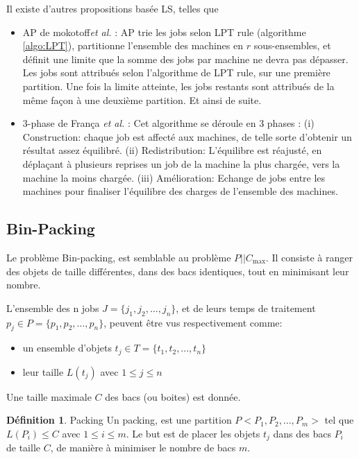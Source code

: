 \documentclass[a4paper,12pt]{report}
\theoremstyle{plain}				%
\theoremstyle{definition}				%
\newtheorem{definition}{Définition} %
\newcommand\problemGrahamP{$P||C_{\max}$\xspace}
\newcommand{\lp}[1]{\todo[author=LP,color=yellow,inline]{#1}}
\newcommand{\fco}[1]{\todo[author=FCO,color=blue,inline]{#1}}
\begin{document}
Il existe d'autres propositions basée LS, telles que
\begin{itemize}


\item AP de mokotoff\emph{et al.} \cite{mokotoff2004exact}:
AP trie les jobs selon LPT rule (algorithme \ref{algo:LPT}),
partitionne l'ensemble des machines en $r$ sous-ensembles, et définit
une limite que la somme des jobs par machine ne devra pas dépasser.
Les jobs sont attribués selon l'algorithme de LPT rule, sur une
première partition.
Une fois la limite atteinte, les jobs restants sont attribués de la
même façon à une deuxième partition.
Et ainsi de suite.

\item 3-phase de França \emph{et al.} \cite{francca1994composite}:
  Cet algorithme se déroule en 3 phases :
  (i) Construction: chaque job est affecté aux machines, de telle
  sorte d'obtenir un résultat assez équilibré.
  (ii) Redistribution: L'équilibre est réajusté, en déplaçant à
  plusieurs reprises un job de la machine la plus chargée, vers
  la machine la moins chargée.
  (iii) Amélioration: Echange de jobs entre les machines pour
  finaliser l'équilibre des charges de l'ensemble des machines.

\end{itemize}

\lp{Dire en 2 mots ce qu'ils font?}
\fco{ok, fait}


\subsection{Bin-Packing} \label{ssec:heuristiquesBinPacking}

Le problème Bin-packing, est semblable au problème \problemGrahamP.
Il consiste à ranger des objets de taille différentes, dans des bacs
identiques, tout en minimisant leur nombre.

L'ensemble des n jobs $J = \{j_1, j_2, \ldots, j_n\}$, et de leurs temps de
traitement $p_j \in P = \{p_1, p_2, ..., p_n\}$, peuvent être vus
respectivement comme:
\begin{itemize}
\item un ensemble d'objets $t_j \in T = \{t_1, t_2, ..., t_n\}$
\item leur taille $L(t_j)$ avec $1 \le j \le n$
\end{itemize}
Une taille maximale $C$ des bacs (ou boites) est donnée.
\bigskip

\begin{definition}{Packing}
  Un packing, est une partition $P<P_1, P_2, ..., P_m>$ tel que
  $L(P_i) \leq C$ avec $1 \leq i\leq m$.
  Le but est de placer les objets $t_j$ dans des bacs $P_i$ de taille
  $C$, de manière à minimiser le nombre de bacs $m$.
\end{definition}
\end{document}
